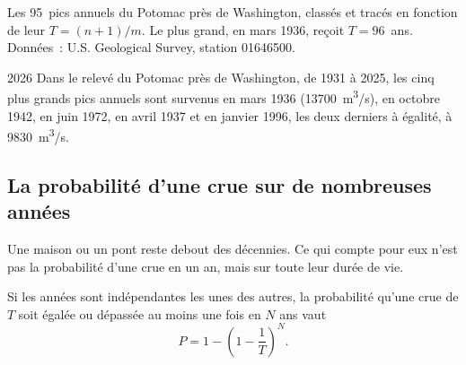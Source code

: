 \begin{omfigure}

{\small Les \num{95}~pics annuels du Potomac près de Washington, classés et
tracés en fonction de leur  $T = (n+1)/m$. Le plus grand,
en mars 1936, reçoit $T = 96$~ans. Données~: U.S. Geological Survey,
station 01646500.}
\end{omfigure}

\begin{dated}{2026}
Dans le relevé du Potomac près de Washington, de 1931 à 2025, les cinq plus
grands pics annuels sont survenus en mars 1936 (\qty{13700}{m^3/s}), en
octobre 1942, en juin 1972, en avril 1937 et en janvier 1996, les deux
derniers à égalité, à \qty{9830}{m^3/s}.
\end{dated}

\subsection*{La probabilité d'une crue sur de nombreuses années}

Une maison ou un pont reste debout des décennies. Ce qui compte pour eux
n'est pas la probabilité d'une crue en un an, mais sur toute leur durée de
vie.

\begin{proposition}\label{prop:g10:drainage-basins:chance}
Si les années sont indépendantes les unes des autres, la probabilité qu'une
crue de  $T$ soit égalée ou dépassée au moins une fois en
$N$ ans vaut
\[
P = 1 - \left(1 - \frac{1}{T}\right)^{N}.
\]
\end{proposition}

